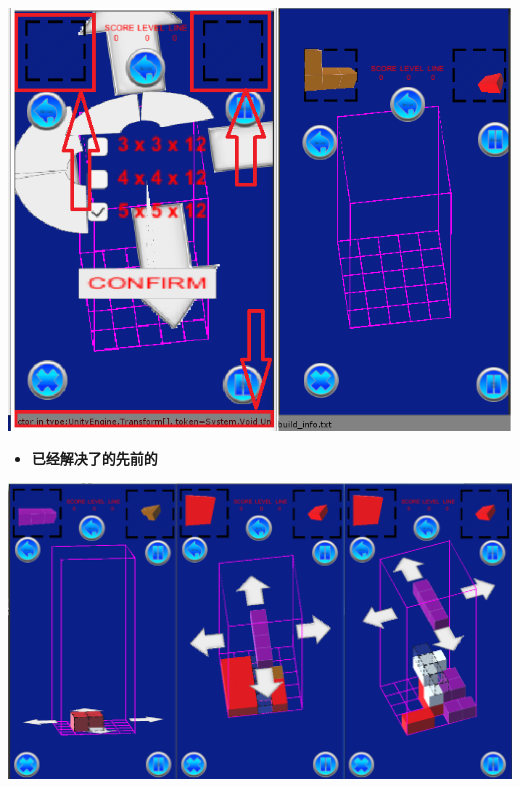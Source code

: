 \documentclass[9pt, b5paper]{article}
\begin{document}
\includegraphics[width=.9\linewidth]{./pic/readme_20221020_195727.png}
\begin{itemize}
\item \textbf{已经解决了的先前的}
\end{itemize}

\includegraphics[width=.9\linewidth]{./pic/readme_20221101_170532.png}
\end{document}
